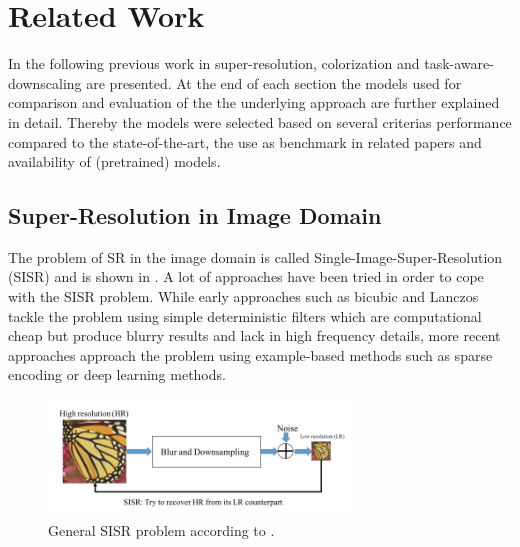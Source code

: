\newpage
\section{Related Work}
\label{sec:RelatedWork}
In the following previous work in super-resolution, colorization and
task-aware-downscaling are presented. At the end of each section the models
used for comparison and evaluation of the the underlying approach are further
explained in detail. Thereby the models were selected based on several criterias
performance compared to the state-of-the-art, the use as benchmark in related
papers and availability of (pretrained) models.

\subsection{Super-Resolution in Image Domain}
The problem of SR in the image domain is called Single-Image-Super-Resolution
(SISR) and is shown in . A lot of approaches have been
tried in order to cope with the SISR problem. While early approaches such as
bicubic and Lanczos \cite{LFIOATD} tackle the problem using simple deterministic
filters which are computational cheap but produce blurry results and lack in
high frequency details, more recent approaches approach the problem using
example-based methods such as sparse encoding or deep learning methods.

\begin{figure}[!htbp]
	\centering
	\includegraphics[width=8cm]{figures/sisr_problem}
	\caption{General SISR problem  according to \cite{DLFSISRABR}.}
  \label{fig:sisr_problem}
\end{figure}

